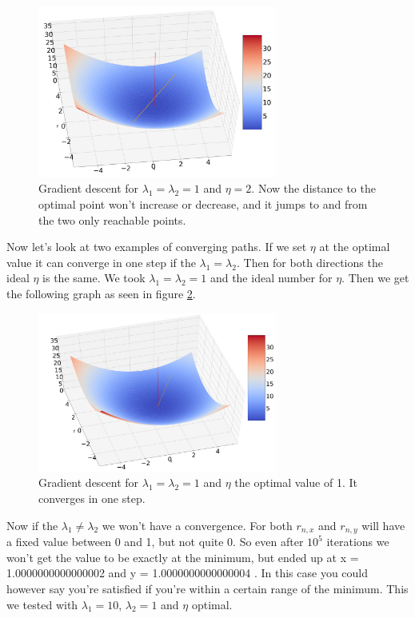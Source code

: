 \documentclass[a4paper]{article}
\begin{document}
\begin{figure}[H]
\includegraphics[width=0.7\textwidth]{Images/NonConLamb.png}
\caption{Gradient descent for $\lambda_1=\lambda_2 = 1$ and $\eta = 2$. Now the distance to the optimal point won't increase or decrease, and it jumps to and from the two only reachable points. }
\label{NonConLamb}
\end{figure}


\newpage

Now let's look at two examples of converging paths. If we set $\eta$ at the optimal value it can converge in one step if the $\lambda_1=\lambda_2$. Then for both directions the ideal $\eta$ is the same. We took $\lambda_1=\lambda_2 = 1$ and the ideal number for $\eta$. Then we get the following graph as seen in figure \ref{Ideal}.

\begin{figure}[H]
\includegraphics[width=0.7\textwidth]{Images/ConvOnce.png}
\caption{Gradient descent for $\lambda_1=\lambda_2=1$ and $\eta$ the optimal value of 1. It converges in one step.}
\label{Ideal}
\end{figure}

Now if the $\lambda_1 \neq \lambda_2$ we won't have a convergence. For both $r_{n,x}$ and $r_{n,y}$ will have a fixed value between 0 and 1, but not quite 0. So even after $10^5$ iterations we won't get the value to be exactly at the minimum, but ended up at x = 1.0000000000000002 and y = 1.0000000000000004 . In this case you could however say you're satisfied if you're within a certain range of the minimum. This we tested with $\lambda_1 = 10$, $\lambda_2 = 1$ and $\eta$ optimal.
\end{document}
